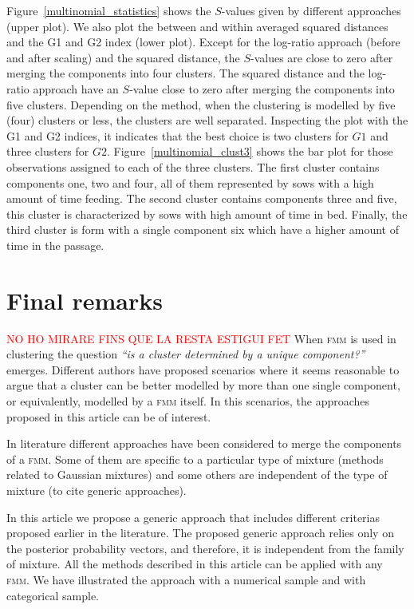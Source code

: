 \documentclass[submit]{smj}
\theoremstyle{definition}
\newcommand{\fmm}{\textsc{fmm}\xspace}
\begin{document}
Figure~\ref{multinomial_statistics} shows the $S$-values given by different approaches (upper plot). We also plot the between and within averaged squared distances and the G1 and G2 index (lower plot). Except for the log-ratio approach (before and after scaling) and the squared distance, the $S$-values are close to zero after merging the components into four clusters. The squared distance and the log-ratio approach have an $S$-value close to zero after merging the components into five clusters. Depending on the method, when the clustering is modelled by five (four) clusters or less, the clusters are well separated. Inspecting the plot with the G1 and G2 indices, it indicates that the best choice is two clusters for $G1$ and three clusters for $G2$. Figure~\ref{multinomial_clust3} shows the bar plot for those observations assigned to each of the three clusters. The first cluster contains components one, two and four, all of them represented by sows with a high amount of time feeding. The second cluster contains components three and five, this cluster is characterized by sows with high amount of time in bed. Finally, the third cluster is form with a single component six which have a higher amount of time in the passage.



\section{Final remarks}\label{remarks}

\textcolor{red}{NO HO MIRARE FINS QUE LA RESTA ESTIGUI FET} When \fmm is used in clustering the question \textit{``is a cluster determined by a unique component?''} emerges. Different authors have proposed scenarios where it seems reasonable to argue that a cluster can be better modelled by more than one single component, or equivalently, modelled by a \fmm itself. In this scenarios, the approaches proposed in this article can be of interest.

In literature different approaches have been considered to merge the components of a \fmm. Some of them are specific to a particular type of mixture (methods related to Gaussian mixtures) and some others are independent of the type of mixture (to cite generic approaches). 

In this article we propose a generic approach that includes different criterias proposed earlier in the literature. The proposed generic approach relies only on the posterior probability vectors, and therefore, it is independent from the family of mixture. All the methods described in this article can be applied with any \fmm. We have illustrated the approach with a numerical sample and with categorical sample. 
\end{document}
